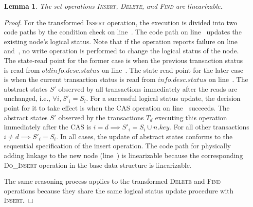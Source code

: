 \documentclass[]{sig-alternate-05-2015}
\newtheorem{lemma}{Lemma}
\begin{document}
\begin{lemma}
    \label{lemma:linearizable}
    The set operations \textsc{Insert}, \textsc{Delete}, and \textsc{Find} are linearizable.
\end{lemma}
\begin{proof}
    For the transformed \textsc{Insert} operation, the execution is divided into two code paths by the condition check on line~.
    The code path on line~ updates the existing node's logical status.
    Note that if the operation reports failure on line~ and~, no write operation is performed to change the logical status of the node.
    The state-read point for the former case is when the previous transaction status is read from $oldinfo.desc.status$ on line~.
    The state-read point for the later case is when the current transaction status is read from $info.desc.status$ on line~.
    The abstract states $S'$ observed by all transactions immediately after the reads are unchanged, i.e., $\forall i, S'_i = S_i $.
    For a successful logical status update, the decision point for it to take effect is when the CAS operation on line~ succeeds.
    The abstract states $S'$ observed by the transactions $T_d$ executing this operation immediately after the CAS is $i=d \implies S'_i = S_i \cup n.key$.
    For all other transactions $i \ne d \implies S'_i = S_i$.
    In all cases, the update of abstract states conforms to the sequential specification of the insert operation.
    The code path for physically adding linkage to the new node (line~) is linearizable because the corresponding \textsc{Do\_Insert} operation in the base data structure is linearizable.
    
    The same reasoning process applies to the transformed \textsc{Delete} and \textsc{Find} operations because they share the same logical status update procedure with \textsc{Insert}.
\end{proof}
\end{document}
